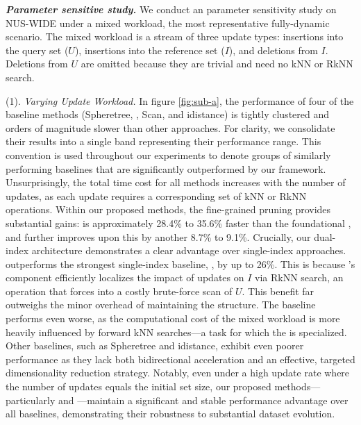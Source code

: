 \noindent \textit{\textbf{Parameter sensitive study.}} We conduct an parameter sensitivity study on NUS-WIDE under a mixed workload, the most representative fully-dynamic scenario. The mixed workload is a stream of three update types: insertions into the query set (\(U\)), insertions into the reference set (\(I\)), and deletions from \(I\). Deletions from \(U\) are omitted because they are trivial and need no kNN or RkNN search.

\noindent(1). \textit{Varying Update Workload.} In figure \ref{fig:sub-a}, the performance of four of the baseline methods (Spheretree, \hdrtree, Scan, and idistance) is tightly clustered and orders of magnitude slower than other approaches. For clarity, we consolidate their results into a single band representing their performance range. This convention is used throughout our experiments to denote groups of similarly performing baselines that are significantly outperformed by our framework. Unsurprisingly, the total time cost for all methods increases with the number of updates, as each update requires a corresponding set of kNN or RkNN operations. Within our proposed methods, the fine-grained pruning provides substantial gains: \dualtreefast is approximately 28.4\% to 35.6\% faster than the foundational \dualtree, and \dualtreeopt further improves upon this by another 8.7\% to 9.1\%. Crucially, our dual-index architecture demonstrates a clear advantage over single-index approaches. \dualtree outperforms the strongest single-index baseline, \deltatree, by up to 26\%. This is because \dualtree's \hdrtree component efficiently localizes the impact of updates on $I$ via RkNN search, an operation that forces \deltatree into a costly brute-force scan of $U$. This benefit far outweighs the minor overhead of maintaining the \hdrtree structure. The \hdrtree baseline performs even worse, as the computational cost of the mixed workload is more heavily influenced by forward kNN searches---a task for which the \deltatree is specialized. Other baselines, such as Spheretree and idistance, exhibit even poorer performance as they lack both bidirectional acceleration and an effective, targeted dimensionality reduction strategy. Notably, even under a high update rate where the number of updates equals the initial set size, our proposed methods---particularly \textbf{\dualtreeopt} and \textbf{\dualtreefast}---maintain a significant and stable performance advantage over all baselines, demonstrating their robustness to substantial dataset evolution.

